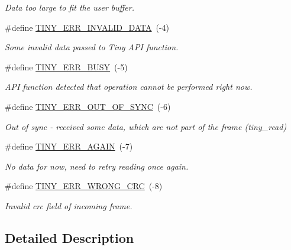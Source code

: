 \begin{DoxyCompactItemize}
\begin{DoxyCompactList}\small\item\em Data too large to fit the user buffer. \end{DoxyCompactList}\item 
\mbox{\label{group__ERROR__FLAGS_ga541a9e67a84e39595ad647d641c4df2e}} 
\#define \hyperlink{group__ERROR__FLAGS_ga541a9e67a84e39595ad647d641c4df2e}{T\+I\+N\+Y\+\_\+\+E\+R\+R\+\_\+\+I\+N\+V\+A\+L\+I\+D\+\_\+\+D\+A\+TA}~(-\/4)
\begin{DoxyCompactList}\small\item\em Some invalid data passed to Tiny A\+PI function. \end{DoxyCompactList}\item 
\mbox{\label{group__ERROR__FLAGS_ga9b3e170e1c6ce269f216ef4a1ac61995}} 
\#define \hyperlink{group__ERROR__FLAGS_ga9b3e170e1c6ce269f216ef4a1ac61995}{T\+I\+N\+Y\+\_\+\+E\+R\+R\+\_\+\+B\+U\+SY}~(-\/5)
\begin{DoxyCompactList}\small\item\em A\+PI function detected that operation cannot be performed right now. \end{DoxyCompactList}\item 
\mbox{\label{group__ERROR__FLAGS_gae1949de45d9c478830dad9c9b996193a}} 
\#define \hyperlink{group__ERROR__FLAGS_gae1949de45d9c478830dad9c9b996193a}{T\+I\+N\+Y\+\_\+\+E\+R\+R\+\_\+\+O\+U\+T\+\_\+\+O\+F\+\_\+\+S\+Y\+NC}~(-\/6)
\begin{DoxyCompactList}\small\item\em Out of sync -\/ received some data, which are not part of the frame (tiny\+\_\+read) \end{DoxyCompactList}\item 
\mbox{\label{group__ERROR__FLAGS_gab15347e8e9f90d709d94d9c151d505b7}} 
\#define \hyperlink{group__ERROR__FLAGS_gab15347e8e9f90d709d94d9c151d505b7}{T\+I\+N\+Y\+\_\+\+E\+R\+R\+\_\+\+A\+G\+A\+IN}~(-\/7)
\begin{DoxyCompactList}\small\item\em No data for now, need to retry reading once again. \end{DoxyCompactList}\item 
\mbox{\label{group__ERROR__FLAGS_ga618f7dd6cead76223e60300212712871}} 
\#define \hyperlink{group__ERROR__FLAGS_ga618f7dd6cead76223e60300212712871}{T\+I\+N\+Y\+\_\+\+E\+R\+R\+\_\+\+W\+R\+O\+N\+G\+\_\+\+C\+RC}~(-\/8)
\begin{DoxyCompactList}\small\item\em Invalid crc field of incoming frame. \end{DoxyCompactList}\end{DoxyCompactItemize}


\subsection{Detailed Description}
